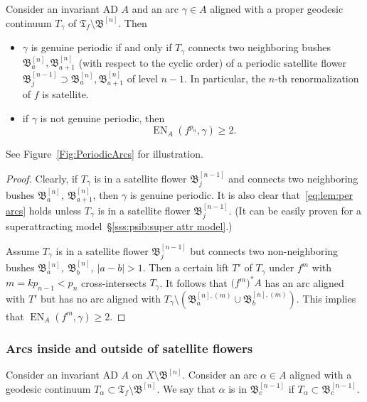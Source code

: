 \documentclass{amsart}
\newcommand{\Hub}{{\mathfrak T}}
\newcommand{\ExpN}{{\operatorname{EN}}}
\newcommand{\bush}{{\mathfrak B }}
\newcommand{\bbush}{{\boldsymbol {\mathfrak B} }}
\newcommand{\1}{{\mathbb 1 }}
\begin{document}
\begin{lem}[Expansivity of $  f\mid {\big[\Hub_f\setminus \bbush^{[n]}\big]}$] 
\label{lem:per arcs}Consider an invariant AD $A$ and an arc $\gamma\in A$ aligned with a proper geodesic continuum $T_\gamma$ of $\Hub_f\setminus \bbush^{[n]}$. Then
\begin{itemize}
\item $\gamma$ is genuine periodic if and only if $T_\gamma $ connects two neighboring bushes $\bush^{[n]}_a, \bush^{[n]}_{a+1}$ (with respect to the cyclic order) of a periodic satellite flower $ \bush^{[n-1]}_j\supset \bush^{[n]}_a, \bush^{[n]}_{a+1}$ of level $n-1$. In particular, the $n$-th renormalization of $f$ is satellite.
\item if $\gamma$ is not genuine periodic, then 
\begin{equation}
\label{eq:lem:per arcs} \ExpN_A(f^{p_n}, \gamma) \ge 2.
\end{equation}
\end{itemize}
\end{lem}
See Figure~\ref{Fig:PeriodicArcs} for illustration.
\begin{proof}Clearly, if $T_\gamma$ is in a satellite flower $\bush^{[n-1]}_j$ and connects two neighboring bushes $\bush^{[n]}_a,\ \bush^{[n]}_{a+1}$, then $\gamma$ is genuine periodic. It is also clear that~\eqref{eq:lem:per arcs} holds unless $T_\gamma$ is in a satellite flower $\bush^{[n-1]}_j$. (It can be easily proven for a superattracting model~\S\ref{sss:psib:super attr model}.)

Assume $T_\gamma$ is in a satellite flower $\bush^{[n-1]}_j$ but connects two non-neighboring bushes $\bush^{[n]}_a,\ \bush^{[n]}_b,\ |a-b|>1$. Then a certain lift $T'$ of $T_\gamma$ under $f^{m}$ with $m=kp_{n-1}<p_n$ cross-intersects $T_\gamma$.  It follows that $\big(f^{m}\big)^* A$ has an arc aligned with $T'$ but has no arc aligned with $T_\gamma\setminus \left( \bush^{[n],(m)}_a\cup \bush^{[n],(m)}_b\right)$. This implies that  $\ExpN_A(f^{m}, \gamma) \ge 2$.


\end{proof}


\subsubsection{Arcs inside and outside of satellite flowers}\label{sss:in out: sat flowers} Consider an invariant AD $A$ on $X\setminus \bbush^{[n]}$. Consider an arc $\alpha\in A$ aligned with a geodesic continuum $T_\alpha\subset \Hub_f\setminus \bbush^{[n]}$. We say that $\alpha$ is in $\bush^{[n-1]}_c$ if $T_\alpha\subset \bush^{[n-1]}_c$.
\end{document}
